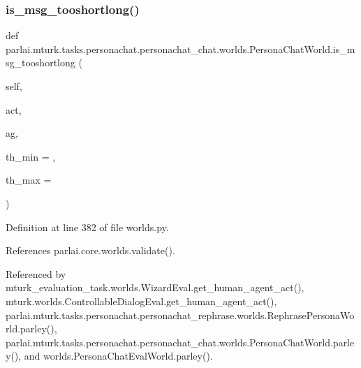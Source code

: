 \subsubsection{\texorpdfstring{is\+\_\+msg\+\_\+tooshortlong()}{is\_msg\_tooshortlong()}}
{\footnotesize\ttfamily def parlai.\+mturk.\+tasks.\+personachat.\+personachat\+\_\+chat.\+worlds.\+Persona\+Chat\+World.\+is\+\_\+msg\+\_\+tooshortlong (\begin{DoxyParamCaption}\item[{}]{self,  }\item[{}]{act,  }\item[{}]{ag,  }\item[{}]{th\+\_\+min = {},  }\item[{}]{th\+\_\+max = {} }\end{DoxyParamCaption})}



Definition at line 382 of file worlds.\+py.



References parlai.\+core.\+worlds.\+validate().



Referenced by mturk\+\_\+evaluation\+\_\+task.\+worlds.\+Wizard\+Eval.\+get\+\_\+human\+\_\+agent\+\_\+act(), mturk.\+worlds.\+Controllable\+Dialog\+Eval.\+get\+\_\+human\+\_\+agent\+\_\+act(), parlai.\+mturk.\+tasks.\+personachat.\+personachat\+\_\+rephrase.\+worlds.\+Rephrase\+Persona\+World.\+parley(), parlai.\+mturk.\+tasks.\+personachat.\+personachat\+\_\+chat.\+worlds.\+Persona\+Chat\+World.\+parley(), and worlds.\+Persona\+Chat\+Eval\+World.\+parley().

